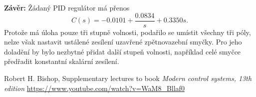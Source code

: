 \documentclass[twoside]{article}
\begin{document}
\textbf{Závěr:}
Žádaný PID regulátor má přenos
\begin{equation}
	C(s) = -0.0101 + \frac{0.0834}{s} + 0.3350 s.
\end{equation}
Protože má úloha pouze tři stupně volnosti, podařilo se umístit všechny tři póly, nelze však nastavit ustálené zesílení
uzavřené zpětnovazební smyčky. Pro jeho doladění by bylo nezbytné přidat další stupeň volnosti, například
celé smyčce předřadit konstantní skalární zesílení.

\begin{thebibliography}{9}

	Robert H. Bishop, Supplementary lectures to book \emph{Modern control systems, 13th edition} \url{https://www.youtube.com/watch?v=WaM8_Bllaf0}

\end{thebibliography}
\end{document}
